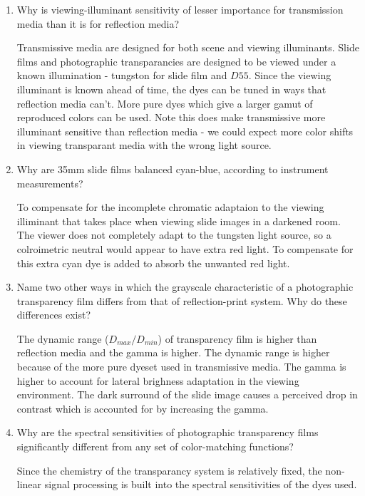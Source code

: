 \begin{enumerate}
 \item
   Why is viewing-illuminant sensitivity of lesser importance for transmission media than it is for reflection media? \newline
 \par Transmissive media are designed for both scene and viewing illuminants.  Slide films and photographic transparancies are designed to be viewed under a known illumination - tungston for slide film and $D{55}$. Since the viewing illuminant is known ahead of time, the dyes can be tuned in ways that reflection media can't. More pure dyes which give a larger gamut of reproduced colors can be used.  Note this does make transmissive more illuminant sensitive than reflection media - we could expect more color shifts in viewing transparant media with the wrong light source. \newline
 \item
   Why are 35mm slide films balanced cyan-blue, according to instrument measurements? \newline
 \par To compensate for the incomplete chromatic adaptaion to the viewing illiminant that takes place when viewing slide images in a darkened room.  The viewer does not completely adapt to the tungsten light source, so a colroimetric neutral would appear to have extra red light.  To compensate for this extra cyan dye is added to absorb the unwanted red light. \newline
 \item
  Name two other ways in which the grayscale characteristic of a photographic transparency film differs from that of reflection-print system. Why do these differences exist? \newline
 \par The dynamic range ($D_{max}/D_{min}$) of transparency film is higher than reflection media and the gamma is higher.  The dynamic range is higher because of the more pure dyeset used in transmissive media.  The gamma is higher to account for lateral brighness adaptation in the viewing environment.  The dark surround of the slide image causes a perceived drop in contrast which is accounted for by increasing the gamma. \newline
 \item
  Why are the spectral sensitivities of photographic transparency films significantly different from any set of color-matching functions? \newline
 \par Since the chemistry of the transparancy system is relatively fixed, the non-linear signal processing is built into the spectral sensitivities of the dyes used. \newline

\end{enumerate}
